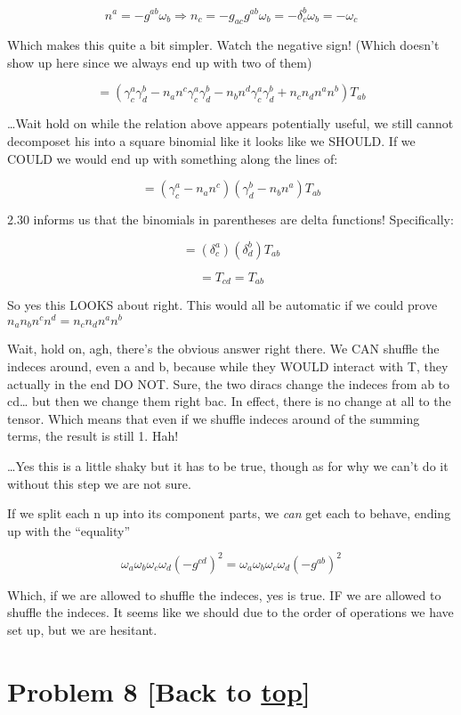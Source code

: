 \documentclass[landscape,letterpaper,10pt,english]{article}
\begin{document}
\[ n^a = -g^{ab}\omega_b \Rightarrow n_c = -g_{ac}g^{ab}\omega_b = -\delta^b_c \omega_b = -\omega_c\]

Which makes this quite a bit simpler. Watch the negative sign! (Which
doesn't show up here since we always end up with two of them)

    \[ = (\gamma^a_c\gamma^b_d - n_an^c \gamma^a_c \gamma^b_d - n_bn^d \gamma^a_c \gamma^b_d + n_cn_dn^an^b)T_{ab} \]

\ldots Wait hold on while the relation above appears potentially useful,
we still cannot decomposet his into a square binomial like it looks like
we SHOULD. If we COULD we would end up with something along the lines
of:

\[ = (\gamma^a_c - n_an^c)(\gamma^b_d-n_bn^a)T_{ab}\]

2.30 informs us that the binomials in parentheses are delta functions!
Specifically:

\[ = (\delta^a_c)(\delta^b_d)T_{ab}\]

\[ = T_{cd} = T_{ab}\]

So yes this LOOKS about right. This would all be automatic if we could
prove \(n_an_bn^cn^d = n_cn_dn^an^b\)

Wait, hold on, agh, there's the obvious answer right there. We CAN
shuffle the indeces around, even a and b, because while they WOULD
interact with T, they actually in the end DO NOT. Sure, the two diracs
change the indeces from ab to cd\ldots{} but then we change them right
bac. In effect, there is no change at all to the tensor. Which means
that even if we shuffle indeces around of the summing terms, the result
is still 1. Hah!

\ldots Yes this is a little shaky but it has to be true, though as for
why we can't do it without this step we are not sure.

If we split each n up into its component parts, we \emph{can} get each
to behave, ending up with the ``equality''

\[ \omega_a\omega_b\omega_c\omega_d (-g^{cd})^2 = \omega_a\omega_b\omega_c\omega_d (-g^{ab})^2 \]

Which, if we are allowed to shuffle the indeces, yes is true. IF we are
allowed to shuffle the indeces. It seems like we should due to the order
of operations we have set up, but we are hesitant.

    \hypertarget{problem-8-back-to-top}{%
\section{\texorpdfstring{Problem 8 {[}Back to
\hyperref[toc]{top}{]}}{Problem 8 {[}Back to {]}}}\label{problem-8-back-to-top}}
\end{document}
